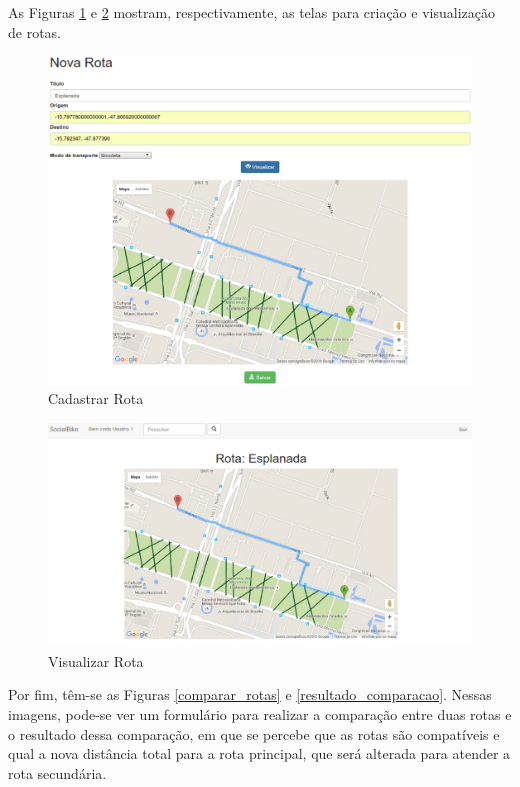 As Figuras \ref{cadastrar_rota} e \ref{ver_rota} mostram, respectivamente, as telas para criação e visualização de rotas.

\newpage
\begin{figure}[!h]
	\centering
	\includegraphics[scale=0.45]{figuras/resultados/cadastrar_rota.eps}
	\caption[Cadastrar Rota]{Cadastrar Rota}
	\label{cadastrar_rota}
\end{figure}

\begin{figure}[!h]
	\centering
	\includegraphics[scale=0.45]{figuras/resultados/ver_rota.eps}
	\caption[Visualizar Rota]{Visualizar Rota}
	\label{ver_rota}
\end{figure}

Por fim, têm-se as Figuras \ref{comparar_rotas} e \ref{resultado_comparacao}. Nessas imagens, pode-se ver um formulário para realizar a comparação entre duas rotas e o resultado dessa comparação, em que se percebe que as rotas são compatíveis e qual a nova distância total para a rota principal, que será alterada para atender a rota secundária.

